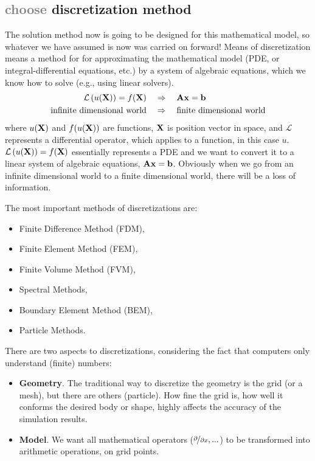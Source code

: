 \subsection{\textcolor{gray}{choose} discretization method}

The solution method now is going to be designed for this mathematical model, so whatever we have assumed is now was carried on forward!
Means of discretization means a method for for approximating the mathematical model (PDE, or integral-differential equations, etc.) by a system of algebraic equations, which we know how to solve (e.g., using linear solvers).
%
\begin{equation}
\begin{aligned}
  \mathcal{L}\left( u(\mathbf{X}) \right) = f(\mathbf{X}) \quad &\Rightarrow \quad \mathbf{A}\mathbf{x} = \mathbf{b} \\
  \text{infinite dimensional world} \quad &\Rightarrow \quad \text{finite dimensional world}
\end{aligned}
\end{equation}
%
where \(u(\mathbf{X})\) and \(f(u(\mathbf{X}))\) are functions, \(\mathbf{X}\) is position vector in space, and \(\mathcal{L}\) represents a differential operator, which applies to a function, in this case \(u\).
\(\mathcal{L}\left( u(\mathbf{X}) \right) = f(\mathbf{X})\) essentially represents a PDE and we want to convert it to a linear system of algebraic equations, \(\mathbf{A}\mathbf{x} = \mathbf{b}\). Obviously when we go from an infinite dimensional world to a finite dimensional world, there will be a loss of information.

The most important methods of discretizations are:
%
\begin{itemize}
  \item Finite Difference Method (FDM),
  \item Finite Element Method (FEM),
  \item Finite Volume Method (FVM),
  \item Spectral Methods,
  \item Boundary Element Method (BEM),
  \item Particle Methods.
\end{itemize}

There are two aspects to discretizations, considering the fact that computers only understand (finite) numbers:
%
\begin{itemize}
  \item \textbf{Geometry}. The traditional way to discretize the geometry is the grid (or a mesh), but there are others (particle).
    How fine the grid is, how well it conforms the desired body or shape, highly affects the accuracy of the simulation results.
  \item \textbf{Model}. We want all mathematical operators (\(\nicefrac{\partial}{\partial x}, ...\)) to be transformed into arithmetic operations, on grid points.
\end{itemize}


